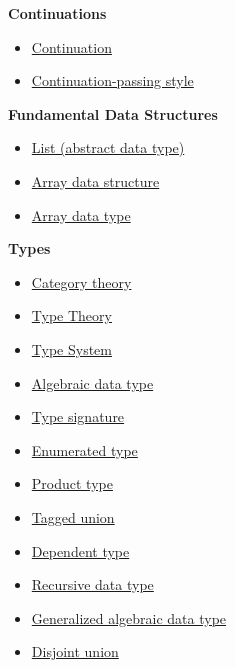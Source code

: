\documentclass[11pt]{article}
\begin{document}
\textbf{Continuations}

\begin{itemize}
\item \href{http://en.wikipedia.org/wiki/Continuation}{Continuation}
\item \href{http://en.wikipedia.org/wiki/Continuation-passing_style}{Continuation-passing style}
\end{itemize}

\textbf{Fundamental Data Structures}

\begin{itemize}
\item \href{https://en.wikipedia.org/wiki/List_\%28abstract_data_type\%29}{List (abstract data type)}
\item \href{https://en.wikipedia.org/wiki/Array_data_structure}{Array data structure}
\item \href{https://en.wikipedia.org/wiki/Array_data_type}{Array data type}
\end{itemize}


\textbf{Types}

\begin{itemize}
\item \href{https://en.wikipedia.org/wiki/Category_theory}{Category theory}
\item \href{https://en.wikipedia.org/wiki/Type_theory}{Type Theory}
\item \href{https://en.wikipedia.org/wiki/Type_system}{Type System}

\item \href{https://en.wikipedia.org/wiki/Algebraic_data_type}{Algebraic data type}

\item \href{https://en.wikipedia.org/wiki/Type_signature}{Type signature}
\item \href{https://en.wikipedia.org/wiki/Enumerated_type}{Enumerated type}
\item \href{https://en.wikipedia.org/wiki/Product_type}{Product type}
\item \href{https://en.wikipedia.org/wiki/Tagged_union}{Tagged union}
\item \href{https://en.wikipedia.org/wiki/Dependent_type}{Dependent type}
\end{itemize}


\begin{itemize}
\item \href{https://en.wikipedia.org/wiki/Recursive_data_type}{Recursive data type}

\item \href{https://en.wikipedia.org/wiki/Generalized_algebraic_data_type}{Generalized algebraic data type}

\item \href{https://en.wikipedia.org/wiki/Disjoint_union}{Disjoint union}
\end{itemize}
\end{document}
